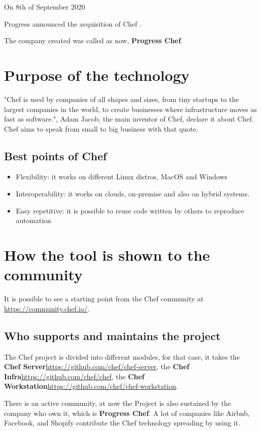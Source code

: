 \documentclass[12pt,a4paper,openright,twoside]{book}
\begin{document}
On 8th of September 2020

Progress announced the acquisition of Chef \cite{chefStory3}.

The company created was called as now, \textbf{Progress Chef}.


\section{Purpose of the technology}
"Chef is used by companies of all shapes and sizes, from tiny startups to the largest companies in the world, to create businesses where infrastructure moves as fast as software.", Adam Jacob, the main inventor of Chef, declare it about Chef.
Chef aims to speak from small to big business with that quote.

\subsection{Best points of Chef}

\begin{itemize}
\item{Flexibility}: it works on different Linux distros, MacOS and Windows
\item{Interoperability}: it works on clouds, on-premise and also on hybrid systems.
\item{Easy repetitive}: it is possible to reuse code written by others to reproduce automation
\end{itemize}

\section{How the tool is shown to the community}
It is possible to see a starting point from the Chef community at \url{https://community.chef.io/}.

\subsection{Who supports and maintains the project}
The Chef project is divided into different modules, for that case, it takes the \textbf{Chef Server}\url{https://github.com/chef/chef-server},
the \textbf{Chef Infra}\url{https://github.com/chef/chef}, the \textbf{Chef Workstation}\url{https://github.com/chef/chef-workstation}.

There is an active community, at now the Project is also sustained by the company who own it, which is \textbf{Progress Chef}.
A lot of companies like Airbnb, Facebook, and Shopify contribute the Chef technology spreading by using it.
\end{document}
